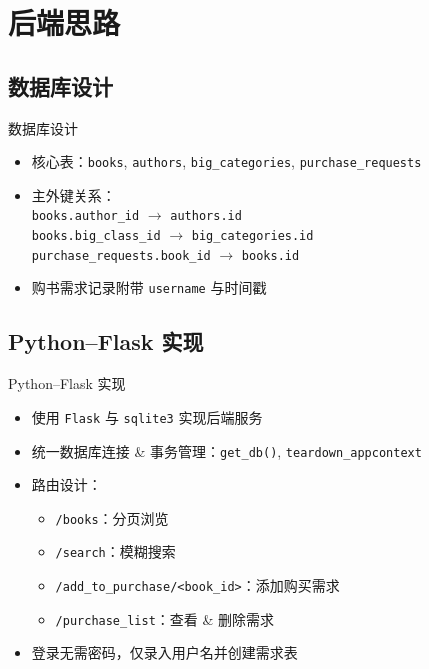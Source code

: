 \documentclass{ctexbeamer}
\begin{document}
\section{后端思路}

\subsection{数据库设计}
\begin{frame}{数据库设计}
  \begin{itemize}
    \item 核心表：\texttt{books}, \texttt{authors}, \texttt{big_categories}, \texttt{purchase_requests}
    \item 主外键关系：\\
      \texttt{books.author\_id} \ensuremath{\to} \texttt{authors.id}\\
      \texttt{books.big\_class\_id} \ensuremath{\to} \texttt{big_categories.id}\\
      \texttt{purchase\_requests.book\_id} \ensuremath{\to} \texttt{books.id}
    \item 购书需求记录附带 \texttt{username} 与时间戳
  \end{itemize}
\end{frame}

\subsection{Python–Flask 实现}
\begin{frame}{Python–Flask 实现}
  \begin{itemize}
    \item 使用 \texttt{Flask} 与 \texttt{sqlite3} 实现后端服务
    \item 统一数据库连接 & 事务管理：\texttt{get\_db()}, \texttt{teardown\_appcontext}
    \item 路由设计：
      \begin{itemize}
        \item \texttt{/books}：分页浏览
        \item \texttt{/search}：模糊搜索
        \item \texttt{/add\_to\_purchase/<book\_id>}：添加购买需求
        \item \texttt{/purchase\_list}：查看 \& 删除需求
      \end{itemize}
    \item 登录无需密码，仅录入用户名并创建需求表
  \end{itemize}
\end{frame}
\end{document}
